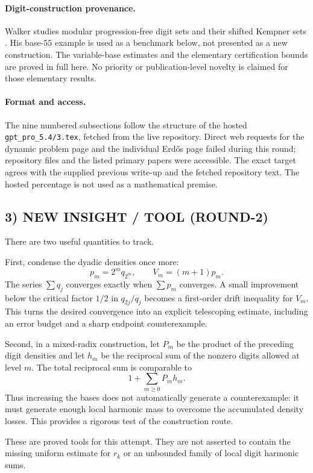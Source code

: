 \paragraph{Digit-construction provenance.}
Walker studies modular progression-free digit sets and their shifted Kempner sets \cite{walker}. His base-$55$ example is used as a benchmark below, not presented as a new construction. The variable-base estimates and the elementary certification bounds are proved in full here. No priority or publication-level novelty is claimed for those elementary results.

\paragraph{Format and access.}
The nine numbered subsections follow the structure of the hosted \texttt{gpt\_pro\_5.4/3.tex}, fetched from the live repository. Direct web requests for the dynamic problem page and the individual Erd\H{o}s page failed during this round; repository files and the listed primary papers were accessible. The exact target agrees with the supplied previous write-up and the fetched repository text. The hosted percentage is not used as a mathematical premise.

\subsection{3) NEW INSIGHT / TOOL (ROUND-2)}

There are two useful quantities to track.

First, condense the dyadic densities once more:
\[
p_m=2^m q_{2^m},\qquad V_m=(m+1)p_m.
\]
The series $\sum q_j$ converges exactly when $\sum p_m$ converges. A small improvement below the critical factor $1/2$ in $q_{2j}/q_j$ becomes a first-order drift inequality for $V_m$. This turns the desired convergence into an explicit telescoping estimate, including an error budget and a sharp endpoint counterexample.

Second, in a mixed-radix construction, let $P_m$ be the product of the preceding digit densities and let $h_m$ be the reciprocal sum of the nonzero digits allowed at level $m$. The total reciprocal sum is comparable to
\[
1+\sum_{m\ge0}P_mh_m.
\]
Thus increasing the bases does not automatically generate a counterexample: it must generate enough local harmonic mass to overcome the accumulated density losses. This provides a rigorous test of the construction route.

These are proved tools for this attempt. They are not asserted to contain the missing uniform estimate for $r_k$ or an unbounded family of local digit harmonic sums.

